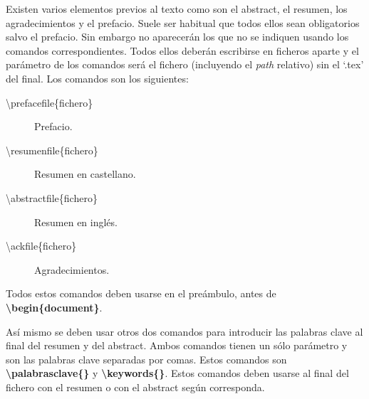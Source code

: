 Existen varios elementos previos al texto como son el abstract, el resumen, los agradecimientos y el prefacio. Suele ser habitual que todos ellos sean obligatorios salvo el prefacio. Sin embargo no aparecerán los que no se indiquen usando los comandos correspondientes. Todos ellos deberán escribirse en ficheros aparte y el parámetro de los comandos será el fichero (incluyendo el \textit{path} relativo) sin el `.tex' del final. Los comandos son los siguientes:

\begin{description}
  \item [\textbackslash prefacefile\{fichero\}] Prefacio.
  \item [\textbackslash resumenfile\{fichero\}] Resumen en castellano.
  \item [\textbackslash abstractfile\{fichero\}] Resumen en inglés.
  \item [\textbackslash ackfile\{fichero\}] Agradecimientos.
\end{description}

Todos estos comandos deben usarse en el preámbulo, antes de \textbf{\textbackslash begin\{document\}}.

Así mismo se deben usar otros dos comandos para introducir las palabras clave al final del resumen y del abstract. Ambos comandos tienen un sólo parámetro y son las palabras clave separadas por comas. Estos comandos son \textbf{\textbackslash palabrasclave\{\}} y \textbf{\textbackslash keywords\{\}}. Estos comandos deben usarse al final del fichero con el resumen o con el abstract según corresponda.
